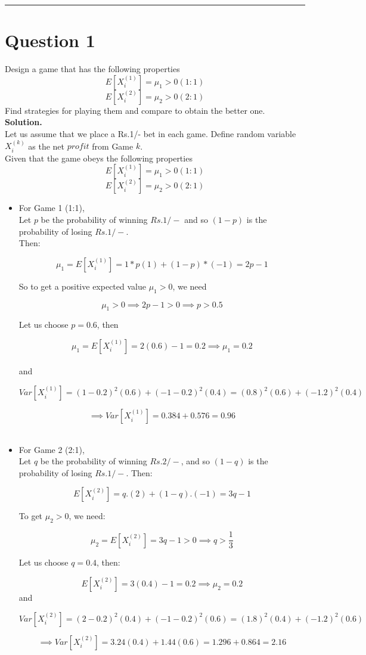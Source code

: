 \hrule



\section*{Question 1}
Design a game that has the following properties
$$E[X_i^{(1)}] = \mu_1 > 0 (1:1)$$
$$E[X_i^{(2)}] = \mu_2 > 0 (2:1)$$
Find strategies for playing them and compare to obtain the better one.\\

\textbf{Solution.}\\
Let us assume that we place a Rs.1/- bet in each game. Define random variable $X_i^{(k)}$ as the net $profit$ from Game $k$.\\

Given that the game obeys the following properties
$$E[X_i^{(1)}] = \mu_1 > 0 (1:1)$$
$$E[X_i^{(2)}] = \mu_2 > 0 (2:1)$$

\begin{itemize}
\item For Game 1 (1:1),\\
Let $p$ be the probability of winning $Rs.1/-$ and so $(1-p)$ is the probability of losing $Rs.1/-.$\\
Then:

\[
\mu_1 = E[X_i^{(1)}] = 1*p(1) + (1-p)*(-1)=2p-1
\]

So to get a positive expected value $\mu_1>0$, we need

\[
\mu_1 >0 \implies 2p-1>0 \implies p>0.5
\]

Let us choose $p=0.6$, then

\[
\mu_1 = E[X_i^{(1)}] = 2(0.6)-1 = 0.2 \implies \mu_1 = 0.2
\]\\

and 

\[
Var[X_i^{(1)}] = (1-0.2)^2(0.6) + (-1-0.2)^2(0.4) = (0.8)^2(0.6) + (-1.2)^2(0.4)
\]

\[
\implies Var[X_i^{(1)}] = 0.384 + 0.576 =0.96
\]
\\


\item For Game 2 (2:1),\\
Let $q$ be the probability of winning $Rs.2/-$, and so $(1-q)$ is the probability of losing $Rs.1/-.$
Then:

\[
E[X_i^{(2)}] = q.(2) + (1-q).(-1) = 3q-1
\]

To get $\mu_2>0$, we need:

\[
\mu_2 = E[X_i^{(2)}] = 3q-1 >0 \implies q> \frac{1}{3}
\]

Let us choose $q=0.4$, then:

\[
E[X_i^{(2)}] = 3(0.4) - 1 = 0.2 \implies \mu_2 = 0.2
\]
and

\[
Var[X_i^{(2)}] = (2-0.2)^2(0.4) + (-1-0.2)^2(0.6) = (1.8)^2(0.4) + (-1.2)^2(0.6)
\]

\[
\implies Var[X_i^{(2)}] = 3.24(0.4) + 1.44(0.6) = 1.296 + 0.864 = 2.16
\]

\end{itemize}

